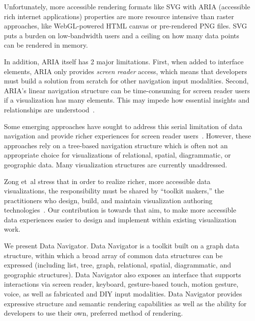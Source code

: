 \documentclass[12pt]{cmuthesis}
\newcommand{\ea}{{et~al\xperiod}\xspace}
\begin{document}
Unfortunately, more accessible rendering formats like SVG with ARIA (accessible rich internet applications) properties are more resource intensive than raster approaches, like WebGL-powered HTML canvas or pre-rendered PNG files. SVG puts a burden on low-bandwidth users and a ceiling on how many data points can be rendered in memory.

In addition, ARIA itself has 2 major limitations. First, when added to interface elements, ARIA only provides \textit{screen reader} access, which means that developers must build a solution from scratch for other navigation input modalities. Second, ARIA's linear navigation structure can be time-consuming for screen reader users if a visualization has many elements. This may impede how essential insights and relationships are understood~\cite{Sorge2016Polyfilling,Godfrey2018Accessible,Zong2022Rich,Thompson2023Chart,Jung2022Communicating,Sharif2021}.

Some emerging approaches have sought to address this serial limitation of data navigation and provide richer experiences for screen reader users~\cite{Sorge2016Polyfilling,Godfrey2018Accessible,Zong2022Rich,Thompson2023Chart}. However, these approaches rely on a tree-based navigation structure which is often not an appropriate choice for visualizations of relational, spatial, diagrammatic, or geographic data. Many visualization structures are currently unaddressed.

Zong \ea stress that in order to realize richer, more accessible data visualizations, the responsibility must be shared by ``toolkit makers,'' the practitioners who design, build, and maintain visualization authoring technologies~\cite{Zong2022Rich}. Our contribution is towards that aim, to make more accessible data experiences easier to design and implement within existing visualization work.

We present Data Navigator. Data Navigator is a toolkit built on a graph data structure, within which a broad array of common data structures can be expressed (including list, tree, graph, relational, spatial, diagrammatic, and geographic structures). Data Navigator also exposes an interface that supports interactions via screen reader, keyboard, gesture-based touch, motion gesture, voice, as well as fabricated and DIY input modalities. Data Navigator provides expressive structure and semantic rendering capabilities as well as the ability for developers to use their own, preferred method of rendering.
\end{document}
